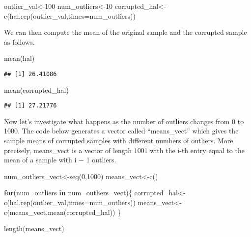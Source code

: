 \documentclass[
]{article}
\newenvironment{Shaded}{\begin{snugshade}}{\end{snugshade}}
\newcommand{\AttributeTok}[1]{\textcolor[rgb]{0.77,0.63,0.00}{#1}}
\newcommand{\ControlFlowTok}[1]{\textcolor[rgb]{0.13,0.29,0.53}{\textbf{#1}}}
\newcommand{\DecValTok}[1]{\textcolor[rgb]{0.00,0.00,0.81}{#1}}
\newcommand{\FunctionTok}[1]{\textcolor[rgb]{0.00,0.00,0.00}{#1}}
\newcommand{\NormalTok}[1]{#1}
\newcommand{\OtherTok}[1]{\textcolor[rgb]{0.56,0.35,0.01}{#1}}
\begin{document}
\begin{Shaded}
\begin{Highlighting}[]
\NormalTok{outlier\_val}\OtherTok{\textless{}{-}}\DecValTok{100}
\NormalTok{num\_outliers}\OtherTok{\textless{}{-}}\DecValTok{10}
\NormalTok{corrupted\_hal}\OtherTok{\textless{}{-}}\FunctionTok{c}\NormalTok{(hal,}\FunctionTok{rep}\NormalTok{(outlier\_val,}\AttributeTok{times=}\NormalTok{num\_outliers))}
\end{Highlighting}
\end{Shaded}

We can then compute the mean of the original sample and the corrupted
sample as follows.

\begin{Shaded}
\begin{Highlighting}[]
\FunctionTok{mean}\NormalTok{(hal)}
\end{Highlighting}
\end{Shaded}

\begin{verbatim}
## [1] 26.41086
\end{verbatim}

\begin{Shaded}
\begin{Highlighting}[]
\FunctionTok{mean}\NormalTok{(corrupted\_hal)}
\end{Highlighting}
\end{Shaded}

\begin{verbatim}
## [1] 27.21776
\end{verbatim}

Now let's investigate what happens as the number of outliers changes
from 0 to 1000. The code below generates a vector called ``means\_vect''
which gives the sample means of corrupted samples with different numbers
of outliers. More precisely, means\_vect is a vector of length 1001 with
the i-th entry equal to the mean of a sample with i − 1 outliers.

\begin{Shaded}
\begin{Highlighting}[]
\NormalTok{num\_outliers\_vect}\OtherTok{\textless{}{-}}\FunctionTok{seq}\NormalTok{(}\DecValTok{0}\NormalTok{,}\DecValTok{1000}\NormalTok{)}
\NormalTok{means\_vect}\OtherTok{\textless{}{-}}\FunctionTok{c}\NormalTok{()}

\ControlFlowTok{for}\NormalTok{(num\_outliers }\ControlFlowTok{in}\NormalTok{ num\_outliers\_vect)\{}
\NormalTok{  corrupted\_hal}\OtherTok{\textless{}{-}}\FunctionTok{c}\NormalTok{(hal,}\FunctionTok{rep}\NormalTok{(outlier\_val,}\AttributeTok{times=}\NormalTok{num\_outliers))}
\NormalTok{  means\_vect}\OtherTok{\textless{}{-}}\FunctionTok{c}\NormalTok{(means\_vect,}\FunctionTok{mean}\NormalTok{(corrupted\_hal))}
\NormalTok{\}}

\FunctionTok{length}\NormalTok{(means\_vect)}
\end{Highlighting}
\end{Shaded}
\end{document}
